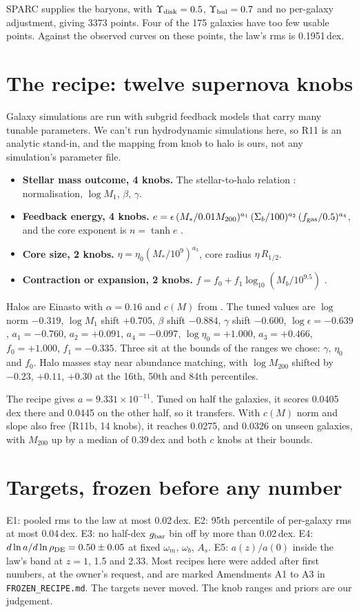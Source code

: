 \documentclass[11pt]{article}
\begin{document}
SPARC \cite{lelli16} supplies the baryons, with $\Upsilon_{\rm disk}=0.5$, $\Upsilon_{\rm bul}=0.7$ and no per-galaxy adjustment, giving 3373 points. Four of the 175 galaxies have too few usable points. Against the observed curves on these points, the law's rms is 0.1951\,dex.

\section{The recipe: twelve supernova knobs}
Galaxy simulations are run with subgrid feedback models that carry many tunable parameters. We can't run hydrodynamic simulations here, so R11 is an analytic stand-in, and the mapping from knob to halo is ours, not any simulation's parameter file.
\begin{itemize}
\item \textbf{Stellar mass outcome, 4 knobs.} The stellar-to-halo relation \cite{moster13}: normalisation, $\log M_1$, $\beta$, $\gamma$.
\item \textbf{Feedback energy, 4 knobs.} $e=\epsilon\,(M_*/0.01M_{200})^{a_1}\,(\Sigma_b/100)^{a_2}\,(f_{\rm gas}/0.5)^{a_4}$, and the core exponent is $n=\tanh e$ \cite{read16}.
\item \textbf{Core size, 2 knobs.} $\eta=\eta_0(M_*/10^9)^{a_3}$, core radius $\eta\,R_{1/2}$.
\item \textbf{Contraction or expansion, 2 knobs.} $f=f_0+f_1\log_{10}(M_b/10^{9.5})$ \cite{blumenthal86}.
\end{itemize}
Halos are Einasto with $\alpha=0.16$ and $c(M)$ from \cite{diemer19}. The tuned values are $\log$ norm $-0.319$, $\log M_1$ shift $+0.705$, $\beta$ shift $-0.884$, $\gamma$ shift $-0.600$, $\log\epsilon=-0.639$, $a_1=-0.760$, $a_2=+0.091$, $a_4=-0.097$, $\log\eta_0=+1.000$, $a_3=+0.466$, $f_0=+1.000$, $f_1=-0.335$. Three sit at the bounds of the ranges we chose: $\gamma$, $\eta_0$ and $f_0$. Halo masses stay near abundance matching, with $\log M_{200}$ shifted by $-0.23$, $+0.11$, $+0.30$ at the 16th, 50th and 84th percentiles.

The recipe gives $a=9.331\times10^{-11}$. Tuned on half the galaxies, it scores 0.0405\,dex there and 0.0445 on the other half, so it transfers. With $c(M)$ norm and slope also free (R11b, 14 knobs), it reaches 0.0275, and 0.0326 on unseen galaxies, with $M_{200}$ up by a median of 0.39\,dex and both $c$ knobs at their bounds.

\section{Targets, frozen before any number}
E1: pooled rms to the law at most 0.02\,dex. E2: 95th percentile of per-galaxy rms at most 0.04\,dex. E3: no half-dex $g_{\rm bar}$ bin off by more than 0.02\,dex. E4: $d\ln a/d\ln\rho_{\rm DE}=0.50\pm0.05$ at fixed $\omega_m$, $\omega_b$, $A_s$. E5: $a(z)/a(0)$ inside the law's band at $z=1$, 1.5 and 2.33. Most recipes here were added after first numbers, at the owner's request, and are marked Amendments A1 to A3 in \texttt{FROZEN\_RECIPE.md}. The targets never moved. The knob ranges and priors are our judgement.
\end{document}
